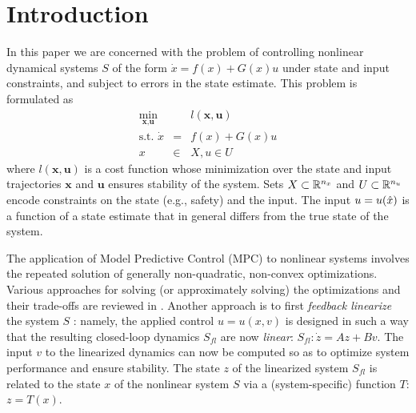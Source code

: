 \section{Introduction}
\label{sec:intro}

In this paper we are concerned with the problem of controlling nonlinear dynamical systems $S$ of the form $\dot{x} = f(x) + G(x)u$ under state and input constraints, and subject to errors in the state estimate.
This problem is formulated as
\begin{eqnarray}
	\label{eq:generic NLMPC}
	\min_{\textbf{x},\textbf{u}} &\;& l(\textbf{x}, \textbf{u}) \\
	\text{s.t. } \dot{x}&=&f(x) + G(x)u \nonumber \\
	x&\in& X, u \in U  \nonumber
\end{eqnarray}
where $l(\textbf{x}, \textbf{u})$ is a cost function whose minimization over the state and input trajectories $\textbf{x}$ and $\textbf{u}$ ensures stability of the system. 
Sets $X \subset \mathbb{R}^{n_x}$ and $ U \subset \mathbb{R}^{n_u}$ encode constraints on the state (e.g., safety) and the input.
The input $u = u(\hat{x})$ is a function of a state estimate that in general differs from the true state of the system.

The application of Model Predictive Control (MPC) to nonlinear systems involves the repeated solution of generally non-quadratic, non-convex optimizations.
Various approaches for solving (or approximately solving) the optimizations and their trade-offs are reviewed in \cite{Cannon04_EfficientMPC}.
Another approach is to first \emph{feedback linearize} the system $S$ \cite{khalil}: namely, the applied control $u = u(x,v)$ is designed in such a way that the resulting closed-loop dynamics $S_{fl}$ are now \emph{linear}: $S_{fl}: \dot{z} = Az + Bv$.
The input $v$ to the linearized dynamics can now be computed so as to optimize system performance and ensure stability.
The state $z$ of the linearized system $S_{fl}$ is related to the state $x$ of the nonlinear system $S$ via a (system-specific) function $T$: $z=T(x)$.

